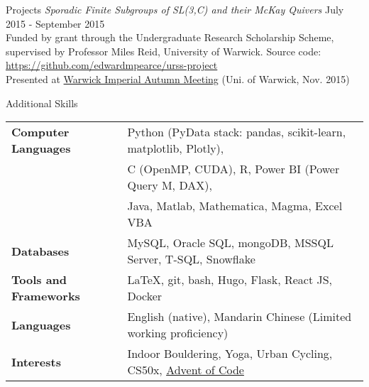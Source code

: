 \documentclass{resume} %
\begin{document}
\begin{rSection}{Projects}
{\em Sporadic Finite Subgroups of SL(3,C) and their McKay Quivers} \hfill July 2015 - September 2015 \\
Funded by grant through the Undergraduate Research Scholarship Scheme, supervised by Professor Miles Reid, University of Warwick. 
Source code: \href{https://github.com/edwardmpearce/urss-project}{https://github.com/edwardmpearce/urss-project} \\
Presented at \href{https://warwick.ac.uk/fac/sci/maths/research/events/2015-16/nonsymposium/wimp/}{Warwick Imperial Autumn Meeting} (Uni. of Warwick, Nov. 2015)

\end{rSection}


\begin{rSection}{Additional Skills}
	
	\begin{tabular}{ @{} >{\bfseries}l @{\hspace{6ex}} l }
		Computer Languages & Python (PyData stack: pandas, scikit-learn, matplotlib, Plotly), \\
		& C (OpenMP, CUDA), R, Power BI (Power Query M, DAX), \\
		& Java, Matlab, Mathematica, Magma, Excel VBA \\
		Databases & MySQL, Oracle SQL, mongoDB, MSSQL Server, T-SQL, Snowflake \\
		Tools and Frameworks & LaTeX, git, bash, Hugo, Flask, React JS, Docker \\
		Languages & English (native), Mandarin Chinese (Limited working proficiency) \smallskip \\
		Interests & Indoor Bouldering, Yoga, Urban Cycling, CS50x, \href{https://github.com/edwardmpearce/adventofcode}{Advent of Code}
	\end{tabular}
	
\end{rSection}





\end{document}
